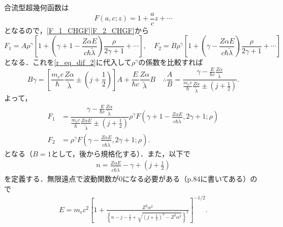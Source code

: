 合流型超幾何函数は
\[F(a,c;z)=1 + \frac{a}{c}z + \cdots\]
となるので，\eqref{F_1_CHGF}\eqref{F_2_CHGF}から
\[F_1=A\rho^\gamma\left[1 + \left(\gamma + 1 - \frac{Z\alpha E}{c\hbar\tilde{\lambda}}\right)\frac{\rho}{2\gamma + 1} + \cdots\right],\quad F_2=B\rho^\gamma\left[1 + \left(\gamma - \frac{Z\alpha E}{c\hbar\tilde{\lambda}}\right)\frac{\rho}{2\gamma + 1} + \cdots\right]\]
となる．これを\eqref{r_eq_dif_2}に代入して$\rho^\gamma$の係数を比較すれば
\[B\gamma=\left[\frac{m_ec}{\hbar}\frac{Z\alpha}{\tilde{\lambda}}\pm\left(j + \frac{1}{2}\right)\right]A + \frac{E}{\hbar c}\frac{Z\alpha}{\tilde{\lambda}}B\quad\therefore\frac{A}{B}=\dfrac{\gamma - \frac{E}{\hbar c}\frac{Z\alpha}{\tilde{\lambda}}}{\frac{m_ec}{\hbar}\frac{Z\alpha}{\tilde{\lambda}}\pm\left(j + \frac{1}{2}\right)}.\]
よって，
\begin{align}
  F_1 &= \dfrac{\gamma - \frac{E}{\hbar c}\frac{Z\alpha }{\tilde{\lambda}}}{\frac{m_ec}{\hbar}\frac{Z\alpha E}{\tilde{\lambda}}\pm\left(j + \frac{1}{2}\right)}\rho^\gamma F\left(\gamma + 1 - \frac{Z\alpha E}{c\hbar\tilde{\lambda}}, 2\gamma + 1; \rho\right)\label{F_1_CHGF_coef}\\
  F_2 &= \rho^\gamma F\left(\gamma - \frac{Z\alpha E}{c\hbar\tilde{\lambda}}, 2\gamma + 1; \rho\right).\label{F_2_CHGF_coef}
\end{align}
となる（$B=1$として，後から規格化する）．また，以下で
\begin{align}
  n=\frac{Z\alpha E}{c\hbar\tilde{\lambda}} - \gamma + \left(j + \frac{1}{2}\right)
\end{align}
を定義する．無限遠点で波動関数が$0$になる必要がある（p.84に書いてある）ので
\begin{align}
  E=m_ec^2\left[1 + \frac{Z^2\alpha^2}{\left\{n - j - \frac{1}{2} + \sqrt{(j + \frac{1}{2})^2 - Z^2\alpha^2}\right\}^2}\right]^{ - 1/2}.\label{E}
\end{align}

